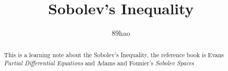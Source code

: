 \documentclass[a4paper]{article}
\begin{document}
\title{Sobolev's Inequality}
\author{89hao}
\maketitle
\begin{abstract}
{This is a learning note about the Sobolev's Inequality, the reference book is Evans {\itshape Partial Differential Equations} and Adams and Founier's {\itshape Sobolev Spaces}}
\end{abstract}


%
%
\end{document}
